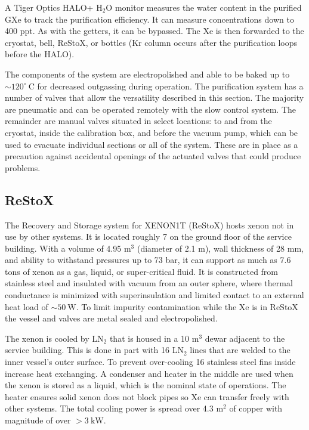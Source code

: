 A Tiger Optics HALO+ H$_2$O monitor measures the water content in the purified GXe to track the purification efficiency.  It can measure
concentrations down to 400 ppt.  As with the getters, it can be bypassed.  The Xe is then forwarded to the cryostat, bell, ReStoX, or
bottles (Kr column occurs after the purification loops before the HALO).

The components of the system are electropolished and able to be baked up to ${\sim} 120^{\circ}\ \mathrm{C}$ for decreased outgassing during
operation.  The purification system has a number of valves that allow the versatility described in this section.  The majority are pneumatic and can
be operated remotely with the slow control system.  The remainder are manual valves situated in select locations: to and from the cryostat,
inside the calibration box, and before the vacuum pump, which can be used to evacuate individual sections or all of the system.  These are
in place as a precaution against accidental openings of the actuated valves that could produce problems.


\subsection{ReStoX}
\label{subsec:xenon1t_restox}
The Recovery and Storage system for XENON1T (ReStoX) hosts xenon not in use by other systems.  It is located roughly 7 on the ground floor of the
service building.  With a volume of 4.95 m$^{3}$
(diameter of 2.1 m), wall thickness of 28 mm, and ability to withstand pressures up to 73 bar, it can support as much as 7.6 tons of xenon
as a gas, liquid, or super-critical fluid.  It is constructed from stainless steel and insulated with vacuum from an outer sphere, where
thermal conductance is minimized with superinsulation and limited contact to an external heat load of ${\sim}50\ \mathrm{W}$.  To limit
impurity contamination while the Xe is in ReStoX the vessel and valves are metal sealed and electropolished.

The xenon is cooled by LN$_2$ that is housed in a 10 m$^3$ dewar adjacent to the service building.  This is done in part with 16 LN$_2$
lines that are welded to the inner vessel's outer surface.  To prevent over-cooling 16 stainless steel fins inside increase heat
exchanging.  A condenser and heater in the middle are used when the xenon is stored as a liquid, which is the nominal state of
operations.  The heater ensures solid xenon does not block pipes so Xe can transfer freely with other systems.  The total cooling power is
spread over 4.3 m$^2$ of copper with magnitude of over $>3\ \mathrm{kW}$.

